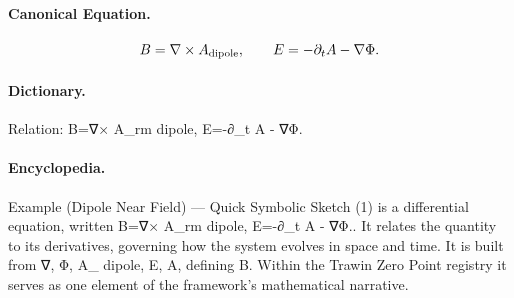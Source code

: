\paragraph{Canonical Equation.}
\[
B=\nabla\times A_{\rm dipole},\qquad E=-\partial_t A - \nabla\Phi.
\]

\paragraph{Dictionary.}
Relation: B=∇× A\_rm dipole, E=-∂\_t A - ∇Φ.

\paragraph{Encyclopedia.}
Example (Dipole Near Field) — Quick Symbolic Sketch (1) is a differential equation, written B=∇× A\_rm dipole, E=-∂\_t A - ∇Φ.. It relates the quantity to its derivatives, governing how the system evolves in space and time. It is built from ∇, Φ, A\_ dipole, E, A, defining B. Within the Trawin Zero Point registry it serves as one element of the framework's mathematical narrative.
